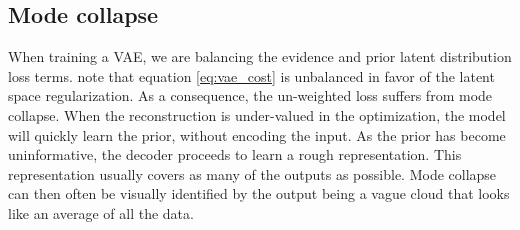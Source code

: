 \subsection{Mode collapse}\label{sec:mode_collapse}

When training a VAE, we are balancing the evidence and prior latent distribution loss terms. \citet{Kingma2013} note that equation \ref{eq:vae_cost} is unbalanced in favor of the latent space regularization. As a consequence, the un-weighted loss suffers from mode collapse. When the reconstruction is under-valued in the optimization, the model will quickly learn the prior, without encoding the input. As the prior has become uninformative, the decoder proceeds to learn a rough representation. This representation usually covers as many of the outputs as possible. Mode collapse can then often be visually identified by the output being a vague cloud that looks like an average of all the data. 
